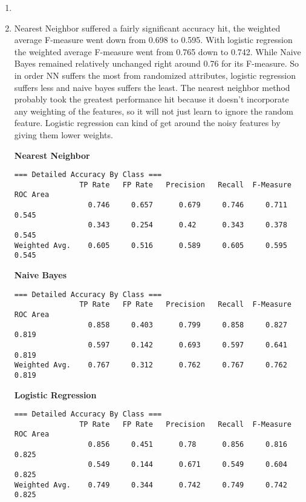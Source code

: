 \documentclass[12pt]{article}
\begin{document}
\begin{enumerate}
\begin{enumerate}
\item %

\item %

Nearest Neighbor suffered a fairly significant accuracy hit, the weighted average F-measure went down from 0.698 to 0.595. With logistic regression the weighted average F-measure went from 0.765 down to  0.742. While Naive Bayes remained relatively unchanged right around 0.76 for its F-measure. So in order NN suffers the most from randomized attributes, logistic regression suffers less and naive bayes suffers the least. The nearest neighbor method probably took the greatest performance hit because it doesn't incorporate any weighting of the features, so it will not just learn to ignore the random feature. Logistic regression can kind of get around the noisy features by giving them lower weights. 

{\bf Nearest Neighbor}
\begin{verbatim}
=== Detailed Accuracy By Class ===
               TP Rate   FP Rate   Precision   Recall  F-Measure   ROC Area 
                 0.746     0.657      0.679     0.746     0.711      0.545  
                 0.343     0.254      0.42      0.343     0.378      0.545   
Weighted Avg.    0.605     0.516      0.589     0.605     0.595      0.545
\end{verbatim}

{\bf Naive Bayes}
\begin{verbatim}
=== Detailed Accuracy By Class ===
               TP Rate   FP Rate   Precision   Recall  F-Measure   ROC Area 
                 0.858     0.403      0.799     0.858     0.827      0.819 
                 0.597     0.142      0.693     0.597     0.641      0.819 
Weighted Avg.    0.767     0.312      0.762     0.767     0.762      0.819
\end{verbatim}

{\bf Logistic Regression}
\begin{verbatim}
=== Detailed Accuracy By Class ===
               TP Rate   FP Rate   Precision   Recall  F-Measure   ROC Area
                 0.856     0.451      0.78      0.856     0.816      0.825  
                 0.549     0.144      0.671     0.549     0.604      0.825 
Weighted Avg.    0.749     0.344      0.742     0.749     0.742      0.825
\end{verbatim}



\end{enumerate}
\end{enumerate}
\end{document}
